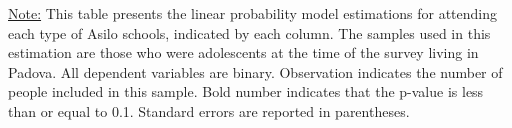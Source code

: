 \begin{scriptsize}
\noindent\underline{Note:} This table presents the linear probability model estimations for attending each type of Asilo schools, indicated by each column. The samples used in this estimation are those who were adolescents at the time of the survey living in Padova. All dependent variables are binary. Observation indicates the number of people included in this sample. Bold number indicates that the p-value is less than or equal to 0.1. Standard errors are reported in parentheses.
\end{scriptsize}
